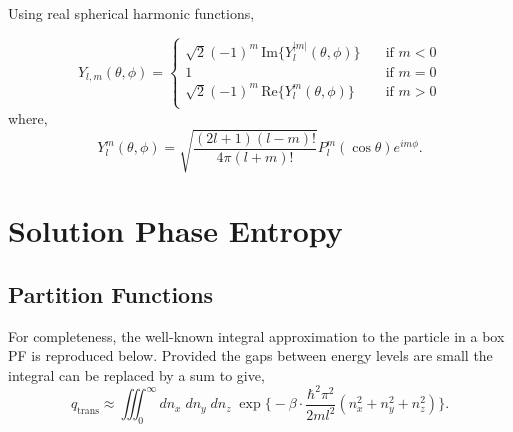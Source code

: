 \documentclass[../main.tex]{subfiles}
\begin{document}
Using real spherical harmonic functions,

\begin{equation}
	Y_{l,m}(\theta, \phi) = \begin{cases}
		\sqrt{2}(-1)^m \,\text{Im}\{Y_l^{|m|}(\theta, \phi)\} &\quad \text{if } m < 0 \\
		1 &\quad \text{if } m = 0 \\
		\sqrt{2}(-1)^m\,\text{Re}\{Y_l^{m}(\theta, \phi)\} &\quad \text{if } m > 0 \\
	\end{cases}
\end{equation}
where,
\begin{equation}
	Y_l^m (\theta, \phi) = \sqrt{\frac{(2l+1)(l- m)!}{4\pi (l+m)!}} P_l^{m}(\cos\theta)e^{im\phi}.
\end{equation}



\section{Solution Phase Entropy}
\subsection{Partition Functions} \label{section::appendix_igm_partition_functions}

For completeness, the well-known integral approximation to the particle in a box PF is reproduced below. Provided the gaps between energy levels are small the integral can be replaced by a sum to give,
\begin{equation}
	q_\text{trans} \approx \iiint_0^\infty dn_x\;dn_y\;dn_z\; \exp{ {\Big \{} -{\beta}\cdot  \frac{\hbar^2 \pi^2}{2ml^2}(n_x^2 + n_y^2 + n_z^2)}{\Big \}}.
\end{equation}
\end{document}
